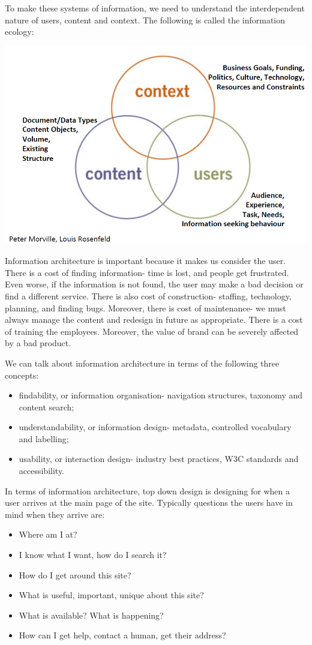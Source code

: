 \documentclass[a4paper, openany]{memoir}
\begin{document}
\noindent To make these systems of information, we need to understand the interdependent nature of users, content and context. The following is called the information ecology:
\begin{center}
    \includegraphics[scale=0.6]{src/L8I3.PNG}
\end{center}

\noindent Information architecture is important because it makes us consider the user. There is a cost of finding information- time is lost, and people get frustrated. Even worse, if the information is not found, the user may make a bad decision or find a different service. There is also cost of construction- staffing, technology, planning, and finding bugs. Moreover, there is cost of maintenance- we must always manage the content and redesign in future as appropriate. There is a cost of training the employees. Moreover, the value of brand can be severely affected by a bad product.

\noindent We can talk about information architecture in terms of the following three concepts:
\begin{itemize}
    \item findability, or information organisation- navigation structures, taxonomy and content search;
    \item understandability, or information design- metadata, controlled vocabulary and labelling;
    \item usability, or interaction design- industry best practices, W3C standards and accessibility.
\end{itemize}

\noindent In terms of information architecture, top down design is designing for when a user arrives at the main page of the site. Typically questions the users have in mind when they arrive are:
\begin{itemize}
    \item Where am I at?
    \item I know what I want, how do I search it?
    \item How do I get around this site?
    \item What is useful, important, unique about this site?
    \item What is available? What is happening?
    \item How can I get help, contact a human, get their address?
\end{itemize}
\end{document}
